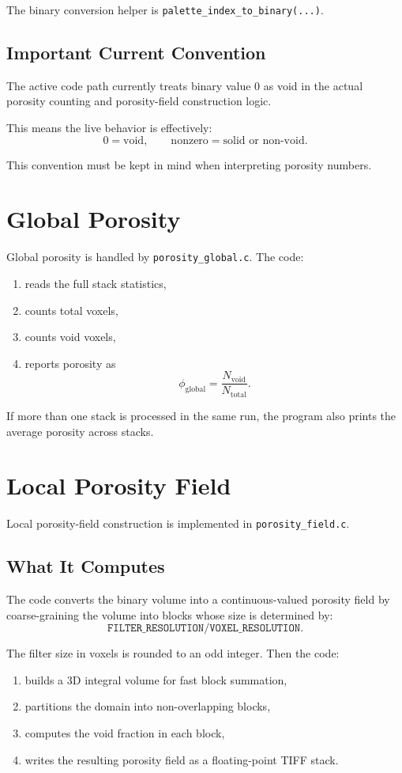 \documentclass[11pt]{article}
\begin{document}
The binary conversion helper is \texttt{palette\_index\_to\_binary(...)}.

\subsection{Important Current Convention}
The active code path currently treats binary value \(0\) as void in the actual
porosity counting and porosity-field construction logic.

This means the live behavior is effectively:
\[
0 = \text{void}, \qquad \text{nonzero} = \text{solid or non-void}.
\]

This convention must be kept in mind when interpreting porosity numbers.

\section{Global Porosity}
Global porosity is handled by \texttt{porosity\_global.c}. The code:
\begin{enumerate}[label=\arabic*.]
\item reads the full stack statistics,
\item counts total voxels,
\item counts void voxels,
\item reports porosity as
\[
\phi_{\mathrm{global}} = \frac{N_{\mathrm{void}}}{N_{\mathrm{total}}}.
\]
\end{enumerate}

If more than one stack is processed in the same run, the program also prints the
average porosity across stacks.

\section{Local Porosity Field}
Local porosity-field construction is implemented in \texttt{porosity\_field.c}.

\subsection{What It Computes}
The code converts the binary volume into a continuous-valued porosity field by
coarse-graining the volume into blocks whose size is determined by:
\[
\texttt{FILTER\_RESOLUTION} / \texttt{VOXEL\_RESOLUTION}.
\]

The filter size in voxels is rounded to an odd integer. Then the code:
\begin{enumerate}[label=\arabic*.]
\item builds a 3D integral volume for fast block summation,
\item partitions the domain into non-overlapping blocks,
\item computes the void fraction in each block,
\item writes the resulting porosity field as a floating-point TIFF stack.
\end{enumerate}
\end{document}
